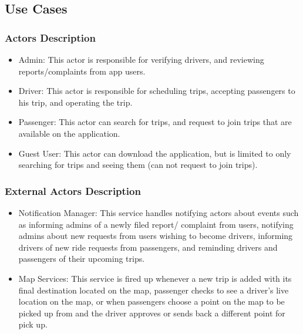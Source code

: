 \documentclass[a4paper, 12pt]{report} %
\begin{document}
    \subsection{Use Cases}
        \subsubsection{Actors Description}
            \begin{itemize}
                \item Admin: This actor is responsible for verifying drivers, and reviewing reports/complaints from app users.
                \item Driver: This actor is responsible for scheduling trips, accepting passengers to his trip, and operating the trip.
                \item Passenger: This actor can search for trips, and request to join trips that are available on the application.
                \item Guest User: This actor can download the application, but is limited to only searching for trips and seeing them (can not request to join trips).
            \end{itemize}
        \subsubsection{External Actors Description}
            \begin{itemize}
                \item Notification Manager: This service handles notifying actors about events such as informing admins of a newly filed report/ complaint from users, notifying admins about new requests from users wishing to become drivers, informing drivers of new ride requests from passengers, and reminding drivers and passengers of their upcoming trips.
                \item Map Services: This service is fired up whenever a new trip is added with its final destination located on the map, passenger checks to see a driver’s live location on the map, or when passengers choose a point on the map to be picked up from and the driver approves or sends back a different point for pick up.
            \end{itemize}
\end{document}
